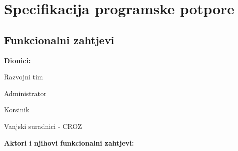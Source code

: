 \chapter{Specifikacija programske potpore}

\section{Funkcionalni zahtjevi}





\noindent \textbf{Dionici:}

\begin{packed_enum}
	
	\item Razvojni tim
	\item Administrator			
	\item Korsinik
	\item Vanjski suradnici - CROZ
	
\end{packed_enum}

\noindent \textbf{Aktori i njihovi funkcionalni zahtjevi:}


